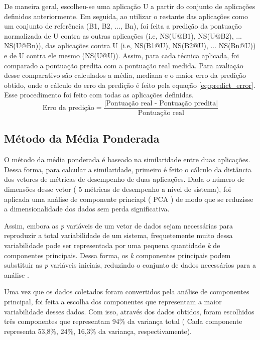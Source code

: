 \documentclass[[10pt,journal]{IEEEtran}
\begin{document}


De maneira geral, escolheu-se uma aplicação U a partir do conjunto de aplicações definidos anteriormente. Em seguida, ao utilizar o restante das aplicações como um conjunto de referência (B1, B2, ..., Bn), foi feita a predição da pontuação normalizada de U contra as outras aplicações (i.e, NS(U@B1), NS(U@B2), ... NS(U@Bn)), das aplicações contra U (i.e, NS(B1@U),
NS(B2@U), ... NS(Bn@U)) e de U contra ele mesmo (NS(U@U)). Assim, para cada técnica aplicada, foi comparado a pontuação predita com a pontuação real medida. Para avaliação desse comparativo são calculados a média, mediana e o maior erro da predição obtido, onde o cálculo do erro da predição é feito pela equação \ref{eq:predict_error}. Esse procedimento foi feito com todas as aplicações definidas.  
\begin{equation}
\label{eq:predict_error}
\textrm{Erro da predição} = \frac{|\textrm{Pontuação real - Pontuação predita}|}{\textrm{Pontuação real}}
\end{equation}

\subsection{Método da Média Ponderada}
O método da média ponderada é baseado na similaridade entre duas aplicações. Dessa forma, para calcular a similaridade, primeiro é feito o cálculo da distância dos vetores de métricas de desempenho de duas aplicações. Dada o número de dimensões desse vetor ( 5 métricas de desempenho a nível de sistema), foi aplicada uma análise de componente princiapl ( PCA ) de modo que se reduzisse a dimensionalidade dos dados sem perda significativa.

Assim, embora as \textit{p} variáveis de um vetor de dados sejam necessárias para reproduzir a total variabilidade de um sistema, frequetemente muito dessa variabilidade pode ser representada por uma pequena quantidade \textit{k} de componentes principais. Dessa forma, os \textit{k} componentes principais podem substituir  as \textit{p} variáveis iniciais, reduzindo o conjunto de dados necessários para a análise \cite{johnson1988}.

Uma vez que os dados coletados foram convertidos pela análise de componentes principal, foi feita a escolha dos componentes que representam a maior variabilidade desses dados. Com isso, através dos dados obtidos, foram escolhidos três componentes que representam 94\% da variança total ( Cada componente representa 53,8\%, 24\%, 16,3\% da variança, respectivamente).
\end{document}

